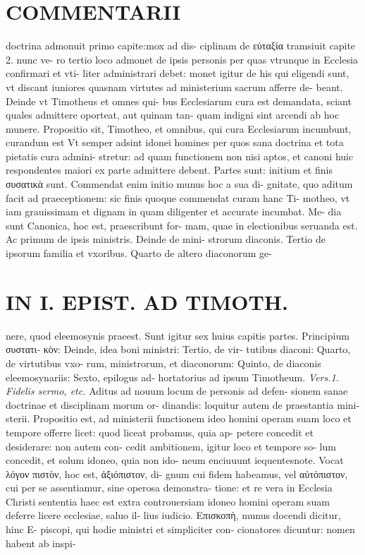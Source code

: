 \documentclass{article}
\begin{document}
\begin{pages}
\section*{COMMENTARII }\pstart doctrina admonuit primo capite:mox ad dis- ciplinam de εὐταξία tramsiuit capite 2. nunc ve- ro tertio loco admonet de ipsis personis per quas vtrunque in Ecclesia confirmari et vti- liter administrari debet: monet igitur de his qui eligendi sunt, vt discant iuniores quasnam virtutes ad ministerium sacrum afferre de- beant. Deinde vt Timotheus et omnes qui- bus Ecclesiarum cura est demandata, sciant quales admittere oporteat, aut quinam tan- quam indigni sint arcendi ab hoc munere.  \pend\pstart Propositio sit, Timotheo, et omnibus, qui cura Ecclesiarum incumbunt, curandum est Vt semper adsint idonei homines per quos sana doctrina et tota pietatis cura admini- stretur: ad quam functionem non nisi aptos, et canoni huic respondentes maiori ex parte admittere debent.  \pend\pstart Partes sunt: initium et finis συσατικὰ sunt. Commendat enim initio munus hoc a sua di- gnitate, quo aditum facit ad praeceptionem: sic finis quoque commendat curam hanc Ti- motheo, vt iam grauissimam et dignam in quam diligenter et accurate incumbat. Me- dia sunt Canonica, hoc est, praescribunt for- mam, quae in electionibus seruanda est. Ac primum de ipsis ministris. Deinde de mini- strorum diaconis. Tertio de ipsorum familia et vxoribus. Quarto de altero diaconorum ge-  \pend
\section*{IN I. EPIST. AD TIMOTH. }
\marginpar{[ p.61 ]}\pstart nere, quod eleemosynis praeest. Sunt igitur sex huius capitis partes. Principium συστατι- κὸν: Deinde, idea boni ministri: Tertio, de vir- tutibus diaconi: Quarto, de virtutibus vxo- rum, ministrorum, et diaconorum: Quinto, de diaconis eleemosynariis: Sexto, epilogus ad- hortatorius ad ipsum Timotheum.  \pend
\textit{Vers.1. Fidelis sermo, etc. }\pstart Aditus ad nouum locum de personis ad defen- sionem sanae doctrinae et disciplinam morum or- dinandis: loquitur autem de praestantia mini- sterii. Propositio est, ad ministerii functionem ideo homini operam suam loco et tempore offerre licet: quod liceat probamus, quia ap- petere concedit et desiderare: non autem con- cedit ambitionem, igitur loco et tempore so- lum concedit, et solum idoneo, quia non ido- neum enciuuunt iequentesnote.  \pend\pstart Vocat λόγον πιστὸν, hoc est, ἀξιόπιστον, di- gnum cui fidem habeamus, vel αὐτόπιστον, cui per se assentiamur, sine operosa demonstra- tione: et re vera in Ecclesia Christi sententia haec est extra controuersiam idoneo homini operam suam deferre licere ecclesiae, saluo il- lius iudicio.  \pend\pstart Επισκοπὴ, munus docendi dicitur, hinc E- piscopi, qui hodie ministri et simpliciter con- cionatores dicuntur: nomen habent ab inspi-  \pend
\marginpar{[ p.62 ]}

\end{pages}
\end{document}
